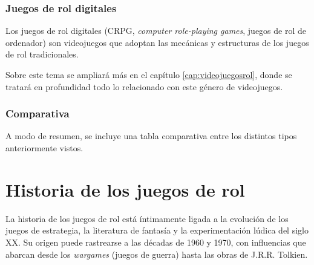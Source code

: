 \subsubsection{Juegos de rol digitales}
Los juegos de rol digitales (CRPG, \textit{computer role-playing games}, juegos de rol de ordenador) son videojuegos que adoptan las mecánicas y estructuras de los juegos de rol tradicionales.

\medskip

Sobre este tema se ampliará más en el capítulo \ref{cap:videojuegosrol}, donde se tratará en profundidad todo lo relacionado con este género de videojuegos.

\subsubsection{Comparativa}
A modo de resumen, se incluye una tabla comparativa entre los distintos tipos anteriormente vistos.
\begin{table}[H]
	\centering
\end{table}

\section{Historia de los juegos de rol}

La historia de los juegos de rol está íntimamente ligada a la evolución de los juegos de estrategia, la literatura de fantasía y la experimentación lúdica del siglo XX. Su origen puede rastrearse a las décadas de 1960 y 1970, con influencias que abarcan desde los \textit{wargames} (juegos de guerra) hasta las obras de J.R.R. Tolkien.

\medskip

